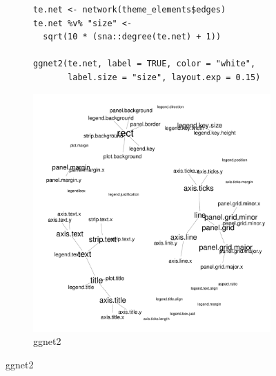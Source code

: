 \begin{figure}[hbtp]
\begin{subfigure}[t]{\textwidth}
\caption{ggnet2}
\vspace{1em}

             \begin{adjustbox}{valign=t}

             \begin{minipage}{.49\textwidth}
 \begin{knitrout}\footnotesize
{}\color{fgcolor}\begin{kframe}
\begin{verbatim}
te.net <- network(theme_elements$edges)
te.net %v% "size" <-
  sqrt(10 * (sna::degree(te.net) + 1))

ggnet2(te.net, label = TRUE, color = "white",
       label.size = "size", layout.exp = 0.15)
\end{verbatim}
\end{kframe}
\end{knitrout} \vspace{1em}

                   \end{minipage}

                  \begin{minipage}{.49\textwidth}

\includegraphics[width=\textwidth]{figure/theme_ggnet2-1.pdf}


\end{minipage}
\end{adjustbox}
\end{subfigure}
\end{figure}
